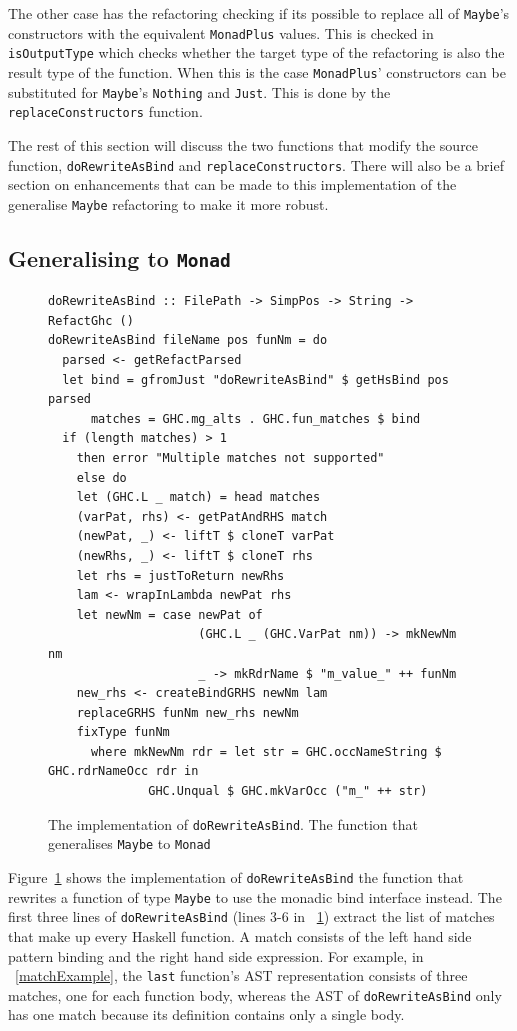 The other case has the refactoring checking if its possible to replace all of \texttt{Maybe}'s constructors with the equivalent \texttt{MonadPlus} values. This is checked in \texttt{isOutputType} which checks whether the target type of the refactoring is also the result type of the function. When this is the case \texttt{MonadPlus}' constructors can be substituted for \texttt{Maybe}'s \texttt{Nothing} and \texttt{Just}. This is done by the \texttt{replaceConstructors} function.

The rest of this section will discuss the two functions that modify the source function, \texttt{doRewriteAsBind} and \texttt{replaceConstructors}. There will also be a brief section on enhancements that can be made to this implementation of the generalise \texttt{Maybe} refactoring to make it more robust.

\subsection{Generalising to \texttt{Monad}}

\begin{figure}[t]
\begin{lstlisting}
doRewriteAsBind :: FilePath -> SimpPos -> String -> RefactGhc ()
doRewriteAsBind fileName pos funNm = do
  parsed <- getRefactParsed
  let bind = gfromJust "doRewriteAsBind" $ getHsBind pos parsed
      matches = GHC.mg_alts . GHC.fun_matches $ bind
  if (length matches) > 1
    then error "Multiple matches not supported"
    else do
    let (GHC.L _ match) = head matches
    (varPat, rhs) <- getPatAndRHS match
    (newPat, _) <- liftT $ cloneT varPat
    (newRhs, _) <- liftT $ cloneT rhs
    let rhs = justToReturn newRhs
    lam <- wrapInLambda newPat rhs
    let newNm = case newPat of
                     (GHC.L _ (GHC.VarPat nm)) -> mkNewNm nm
                     _ -> mkRdrName $ "m_value_" ++ funNm
    new_rhs <- createBindGRHS newNm lam
    replaceGRHS funNm new_rhs newNm
    fixType funNm
      where mkNewNm rdr = let str = GHC.occNameString $ GHC.rdrNameOcc rdr in
              GHC.Unqual $ GHC.mkVarOcc ("m_" ++ str)
\end{lstlisting}
\caption{The implementation of \texttt{doRewriteAsBind}. The function that generalises \texttt{Maybe} to \texttt{Monad}}
\label{doRewriteAsBind}
\end{figure}

Figure~\ref{doRewriteAsBind} shows the implementation of \texttt{doRewriteAsBind} the function that rewrites a function of type \texttt{Maybe} to use the monadic bind interface instead. The first three lines of \texttt{doRewriteAsBind} (lines 3-6 in \DIFdelbegin {}\DIFdelend \DIFaddbegin {}\DIFaddend ~\ref{doRewriteAsBind}) extract the list of matches that make up every Haskell function. A match consists of the left hand side pattern binding and the right hand side expression. For example, in \DIFdelbegin {}\DIFdelend \DIFaddbegin {}\DIFaddend ~\ref{matchExample}, the \texttt{last} function's AST representation consists of three matches, one for each function body, whereas the AST of \texttt{doRewriteAsBind} only has one match because its definition contains only a single body.

